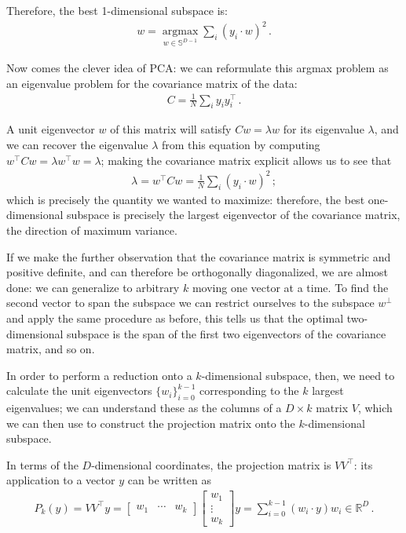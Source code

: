 \documentclass[main.tex]{subfiles}
\begin{document}
Therefore, the best 1-dimensional subspace is: %
%
\begin{align}
w = \underset{w \in \mathbb{S}^{D-1}}{\operatorname{argmax}} \sum _{i} (y_i \cdot w)^2
\,.
\end{align}
%

Now comes the clever idea of \ac{PCA}: we can reformulate this argmax problem as an eigenvalue problem for the covariance matrix of the data: 
%
\begin{align}
C = \frac{1}{N} \sum _{i} y_i y_i^{\top}
\,.
\end{align}

A unit eigenvector \(w\) of this matrix will satisfy \(Cw = \lambda w\) for its eigenvalue \(\lambda \), and we can recover the eigenvalue \(\lambda\) from this equation by computing \(w^{\top} C w = \lambda w^{\top} w = \lambda \); making the covariance matrix explicit allows us to see that 
%
\begin{align}
\lambda = w^{\top} C w =  \frac{1}{N }\sum _{i} (y_i \cdot w)^2
\,;
\end{align}
%
which is precisely the quantity we wanted to maximize: therefore, the best one-dimensional subspace is precisely the largest eigenvector of the covariance matrix, the direction of maximum variance. 

If we make the further observation that the covariance matrix is symmetric and positive definite, and can therefore be orthogonally diagonalized, we are almost done: we can generalize to arbitrary \(k\) moving one vector at a time. 
To find the second vector to span the subspace we can restrict ourselves to the subspace \(w^{\perp}\) and apply the same procedure as before, this tells us that the optimal two-dimensional subspace is the span of the first two eigenvectors of the covariance matrix, and so on. 

In order to perform a reduction onto a \(k\)-dimensional subspace, then, we need to calculate the unit eigenvectors \(\{ w_i\}_{i=0}^{k-1}\) corresponding to the \(k\) largest eigenvalues;
we can understand these as the columns of a \(D \times k\) matrix \(V\), which we can then use to construct the projection matrix onto the \(k\)-dimensional subspace.

In terms of the \(D\)-dimensional coordinates, the projection matrix is \(V V^{\top}\): its application to a vector \(y\) can be written as 
%
\begin{align}
P_k (y) = V V^{\top} y = \left[\begin{array}{ccc}
w_1  & \cdots & w_k
\end{array}\right] 
\left[\begin{array}{c}
w_1  \\ 
\vdots \\ 
w_k
\end{array}\right]
y 
= \sum _{i=0}^{k-1}
(w_i \cdot y) w_i \in \mathbb{R}^{D}
\,.
\end{align}
\end{document}

